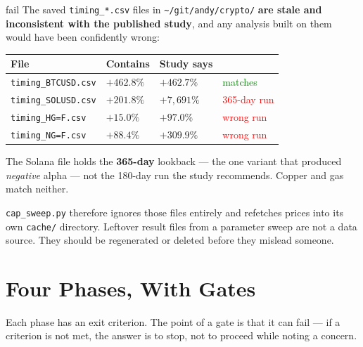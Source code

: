 \documentclass[11pt,a4paper]{article}
\begin{document}
\begin{resultbox}{fail}
The saved \texttt{timing\_*.csv} files in
\texttt{\textasciitilde/git/andy/crypto/} \textbf{are stale and
inconsistent with the published study}, and any analysis built on them
would have been confidently wrong:

\vspace{0.4em}
\centering
\begin{tabular}{@{}llll@{}}
    \toprule
    \textbf{File} & \textbf{Contains} & \textbf{Study says} & \\
    \midrule
    \texttt{timing\_BTCUSD.csv} & $+462.8\%$ & $+462.7\%$ & \textcolor{green}{matches} \\
    \texttt{timing\_SOLUSD.csv} & $+201.8\%$ & $+7{,}691\%$ & \textcolor{red}{365-day run} \\
    \texttt{timing\_HG=F.csv}   & $+15.0\%$  & $+97.0\%$    & \textcolor{red}{wrong run} \\
    \texttt{timing\_NG=F.csv}   & $+88.4\%$  & $+309.9\%$   & \textcolor{red}{wrong run} \\
    \bottomrule
\end{tabular}

\vspace{0.5em}
\raggedright
The Solana file holds the \textbf{365-day} lookback --- the one variant
that produced \emph{negative} alpha --- not the 180-day run the study
recommends. Copper and gas match neither.

\vspace{0.4em}
\texttt{cap\_sweep.py} therefore ignores those files entirely and
refetches prices into its own \texttt{cache/} directory. Leftover
result files from a parameter sweep are not a data source. They should
be regenerated or deleted before they mislead someone.
\end{resultbox}

\section{Four Phases, With Gates}

Each phase has an exit criterion. The point of a gate is that it can
fail --- if a criterion is not met, the answer is to stop, not to
proceed while noting a concern.
\end{document}
